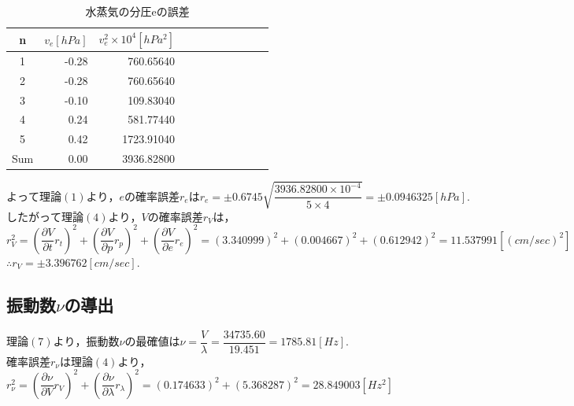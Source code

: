 \documentclass[a4paper,1pt]{jsarticle}
\begin{document}
\begin{table}[H]
  \caption{水蒸気の分圧eの誤差}
  \label{table:SpeedOfLight}
  \centering
  \begin{tabular}{|c||r|r|r|r|r|r|r|r|r|r|}
    \hline
    n & $v_e[hPa]$ & $v_e^2\times 10^4[hPa^2]$ \\
    \hline\hline
    
    1 & -0.28 & 760.65640 \\
    2 & -0.28 & 760.65640 \\
    3 & -0.10 & 109.83040 \\
    4 & 0.24 & 581.77440 \\
    5 & 0.42 & 1723.91040 \\
    

    
   
    
    \hline\hline
    Sum & 0.00 & 3936.82800 \\
    \hline
  \end{tabular}


\end{table}

$よって理論(1)より，eの確率誤差r_eはr_e=\pm0.6745\sqrt{\dfrac{3936.82800\times 10^{-4}}{5\times 4}}=\pm0.0946325[hPa].$\\

$したがって理論(4)より，Vの確率誤差r_Vは，$\\

$r_V^2=\left(\dfrac{\partial V}{\partial t}r_t\right)^2+\left(\dfrac{\partial V}{\partial p}r_p\right)^2+\left(\dfrac{\partial V}{\partial e}r_e\right)^2=(3.340999)^2+(0.004667)^2+(0.612942)^2=11.537991 [(cm/sec)^2]$\\

$\therefore r_V=\pm3.396762[cm/sec].$

\subsection*{振動数$\nu $の導出}

$理論(7)より，振動数\nu の最確値は\nu =\dfrac{V}{\lambda }=\dfrac{34735.60}{19.451}=1785.81[Hz].$\\

$確率誤差r_\nu は理論(4)より，$\\

$r_\nu ^2=\left(\dfrac{\partial \nu }{\partial V}r_V \right)^2+\left(\dfrac{\partial \nu }{\partial \lambda }r_\lambda \right)^2=(0.174633)^2+(5.368287)^2=28.849003[Hz^2]$\\
\end{document}
